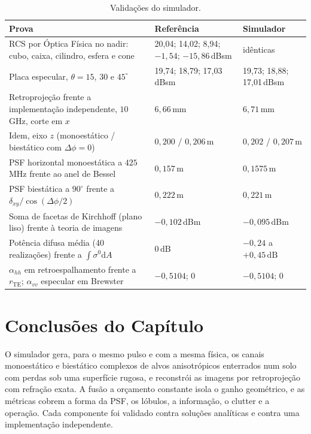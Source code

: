\documentclass[12pt,a4paper,oneside]{book}
\theoremstyle{remark}
\newcommand{\dd}{\mathrm{d}}
\newcommand{\dB}{\,\mathrm{dB}}
\theoremstyle{plain}
\theoremstyle{definition}
\begin{document}
\begin{table}[H]
\centering\small
\caption{Validações do simulador.}
\label{tab:mod_valid}
\begin{tabular}{@{}L{6.2cm}L{3.9cm}L{3.9cm}@{}}
\toprule
\textbf{Prova} & \textbf{Referência} & \textbf{Simulador} \\
\midrule
RCS por Óptica Física no nadir: cubo, caixa, cilindro, esfera e cone
 & 20,04; 14,02; 8,94; $-1,54$; $-15,86\,$dBsm & idênticas \\
Placa especular, $\theta=15$, $30$ e $45^\circ$
 & 19,74; 18,79; 17,03\,dBsm & 19,73; 18,88; 17,01\,dBsm \\
Retroprojeção frente a implementação independente, $10\,$GHz, corte em $x$ & $6,66\,$mm & $6,71\,$mm \\
Idem, eixo $z$ (monoestático / biestático com $\Delta\phi=0$) & $0,200$ / $0,206\,$m & $0,202$ / $0,207\,$m \\
PSF horizontal monoestática a $425\,$MHz frente ao anel de Bessel & $0,157\,$m & $0,1575\,$m \\
PSF biestática a $90^\circ$ frente a $\delta_{xy}/\cos(\Delta\phi/2)$ & $0,222\,$m & $0,221\,$m \\
Soma de facetas de Kirchhoff (plano liso) frente à teoria de imagens & $-0,102\,$dBm & $-0,095\,$dBm \\
Potência difusa média (40 realizações) frente a $\int\sigma^0\dd A$ & $0\dB$ & $-0,24$ a $+0,45\dB$ \\
$\alpha_{hh}$ em retroespalhamento frente a $r_{\text{TE}}$; $\alpha_{vv}$ especular em Brewster
 & $-0,5104$; $0$ & $-0,5104$; $0$ \\
\bottomrule
\end{tabular}
\end{table}

\section{Conclusões do Capítulo}
\label{sec:mod_concl}

O simulador gera, para o mesmo pulso e com a mesma física, os canais
monoestático e biestático complexos de alvos anisotrópicos enterrados num solo
com perdas sob uma superfície rugosa, e reconstrói as imagens por
retroprojeção com refração exata. A fusão a orçamento constante isola o ganho
geométrico, e as métricas cobrem a forma da PSF, os lóbulos, a informação, o
clutter e a operação. Cada componente foi validado contra soluções analíticas e
contra uma implementação independente.
\end{document}
